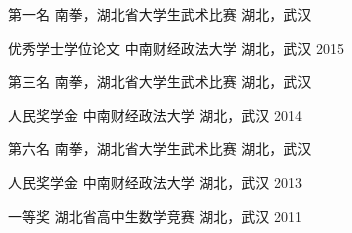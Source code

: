 \begin{cvhonors}

\cvhonor
{第一名} %
{南拳，湖北省大学生武术比赛} %
{湖北，武汉} %
{ } %




\cvhonor
{优秀学士学位论文} %
{中南财经政法大学} %
{湖北，武汉} %
{2015} %



\cvhonor
{第三名} %
{南拳，湖北省大学生武术比赛} %
{湖北，武汉} %
{ } %


\cvhonor
{人民奖学金} %
{中南财经政法大学} %
{湖北，武汉} %
{2014} %


\cvhonor
{第六名} %
{南拳，湖北省大学生武术比赛} %
{湖北，武汉} %
{ } %


\cvhonor
{人民奖学金} %
{中南财经政法大学} %
{湖北，武汉} %
{2013} %


\cvhonor
{一等奖} %
{湖北省高中生数学竞赛} %
{湖北，武汉} %
{2011} %

\end{cvhonors}